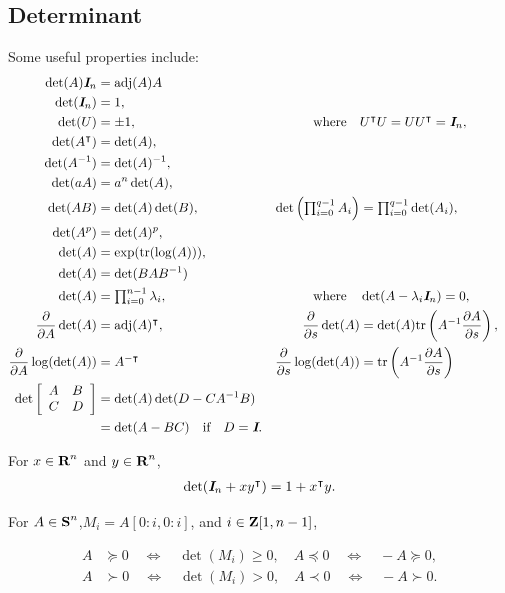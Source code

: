 \documentclass{article}
\begin{document}
\subsection{Determinant}
    Some useful properties include:
    \begin{align*}
        \det(A)\emph{\textbf{I}}_n&=\text{adj}(A)A\\
        \det(\emph{\textbf{I}}_n) &= 1,\\
        \det(U)&=\pm1,
            &\text{where}\quad& U^\intercal U=UU^\intercal = \emph{\textbf{I}}_n,\\
        \det(A^\intercal) & = \det(A),\\
        \det(A^{-1})&= \det(A)^{-1},\\
        \det(aA)&=a^n\det(A),\\
        \det(AB)&=\det(A)\det(B),
            &\det\left(\textstyle\prod_{i=0}^{q-1}A_i\right)
            &=\textstyle\prod_{i=0}^{q-1}\det(A_i),\\
        \det(A^p)&=\det(A)^p,\\
        \det(A)&=\exp(\text{tr}(\log(A))),\\
        \det(A)&=\det(BAB^{-1})\\
        \det(A)&=\textstyle\prod_{i=0}^{n-1}\lambda_i,
            &\text{where}\quad& \det(A-\lambda_i\emph{\textbf{I}}_n)=0,\\
        \frac{\partial }{\partial A}\det(A)&=\mathrm{adj}(A)^\intercal,&\frac{\partial }{\partial s}\det(A)
            &=\det(A)\text{tr}\left(A^{-1}\frac{\partial A}{\partial s}\right),\\
        \frac{\partial }{\partial A}\log(\det(A))&=A^{-\intercal}&\frac{\partial }{\partial s}\log(\det(A))&=\text{tr}\left(A^{-1}\frac{\partial A}{\partial s}\right)\\
        \det\left[\begin{array}{lllllllllllllllllll}A&B\\C&D\end{array}\right]&=\det(A)\det(D-CA^{-1}B)\\
        &=\det(A-BC)\quad\text{if}\quad D=\emph{\textbf{I}}.
    \end{align*}

    For $x\in\textbf{R}^n$ and $y\in\textbf{R}^n$,
    \begin{align*}
        \det(\emph{\textbf{I}}_n+xy^\intercal)=1+x^\intercal y.
    \end{align*}

    For $A\in\textbf{S}^n$,$M_i=A[0:i,0:i]$, and $i\in\textbf{Z}[1,n-1]$,

    \begin{align*}
        A&\succeq0 \quad\Leftrightarrow\quad \det(M_i)\geq0,
        \quad A\preceq0\quad\Leftrightarrow\quad -A\succeq0,\\
        A&\succ0 \quad\Leftrightarrow\quad \det(M_i)>0,
        \quad A\prec0\quad\Leftrightarrow\quad -A\succ0.
    \end{align*}
\end{document}
